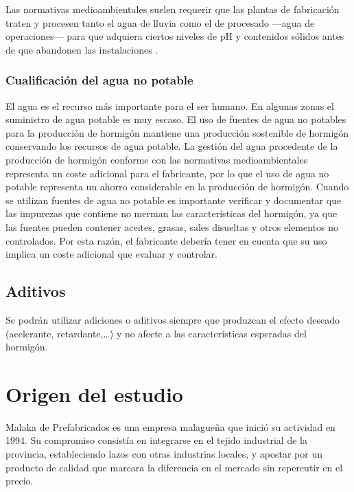 Las normativas medioambientales suelen requerir que las plantas de fabricación traten y procesen tanto el agua de lluvia como el de procesado —agua de operaciones— para que adquiera ciertos niveles de pH y contenidos sólidos antes de que abandonen las instalaciones \cite{ermco}.

\subsubsection{Cualificación del agua no potable}
El agua es el recurso más importante para el ser humano. En algunas zonas el suministro de agua potable es muy escaso. El uso de fuentes de agua no potables para la producción de hormigón mantiene una producción sostenible de hormigón conservando los recursos de agua potable. La gestión del agua procedente de la producción de hormigón conforme con las normativas medioambientales representa un coste adicional para el fabricante, por lo que el uso de agua no potable representa un ahorro considerable en la producción de hormigón. Cuando se utilizan fuentes de agua no potable es importante verificar y documentar que las impurezas que contiene no merman las características del hormigón, ya que las fuentes pueden contener aceites, grasas, sales disueltas y otros elementos no controlados. Por esta razón, el fabricante debería tener en cuenta que su uso implica un coste adicional que evaluar y controlar.

\subsection{Aditivos}
Se podrán utilizar adiciones o aditivos siempre que produzcan el efecto deseado (acelerante, retardante,\ldots) y no afecte a las características esperadas del hormigón.

\section{Origen del estudio}
Malaka de Prefabricados es una empresa malagueña que inició su actividad en 1994. Su compromiso consistía en integrarse en el tejido industrial de la provincia, estableciendo lazos con otras industrias locales, y apostar por un producto de calidad que marcara la diferencia en el mercado sin repercutir en el precio.

